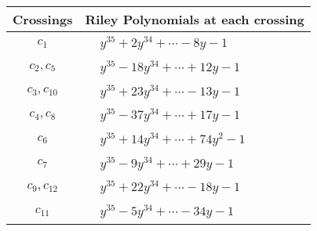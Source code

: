 \documentclass[1p]{elsarticle_modified}
\theoremstyle{definition}
\begin{document}
\begin{tabular}{m{50pt}|m{274pt}}
Crossings & \hspace{64pt}Riley Polynomials at each crossing \\
\hline $$\begin{aligned}c_{1}\end{aligned}$$&$\begin{aligned}
&y^{35}+2 y^{34}+\cdots-8 y-1
\end{aligned}$\\
\hline $$\begin{aligned}c_{2},c_{5}\end{aligned}$$&$\begin{aligned}
&y^{35}-18 y^{34}+\cdots+12 y-1
\end{aligned}$\\
\hline $$\begin{aligned}c_{3},c_{10}\end{aligned}$$&$\begin{aligned}
&y^{35}+23 y^{34}+\cdots-13 y-1
\end{aligned}$\\
\hline $$\begin{aligned}c_{4},c_{8}\end{aligned}$$&$\begin{aligned}
&y^{35}-37 y^{34}+\cdots+17 y-1
\end{aligned}$\\
\hline $$\begin{aligned}c_{6}\end{aligned}$$&$\begin{aligned}
&y^{35}+14 y^{34}+\cdots+74 y^2-1
\end{aligned}$\\
\hline $$\begin{aligned}c_{7}\end{aligned}$$&$\begin{aligned}
&y^{35}-9 y^{34}+\cdots+29 y-1
\end{aligned}$\\
\hline $$\begin{aligned}c_{9},c_{12}\end{aligned}$$&$\begin{aligned}
&y^{35}+22 y^{34}+\cdots-18 y-1
\end{aligned}$\\
\hline $$\begin{aligned}c_{11}\end{aligned}$$&$\begin{aligned}
&y^{35}-5 y^{34}+\cdots-34 y-1
\end{aligned}$\\
\hline
\end{tabular}\\~\\
\end{document}
